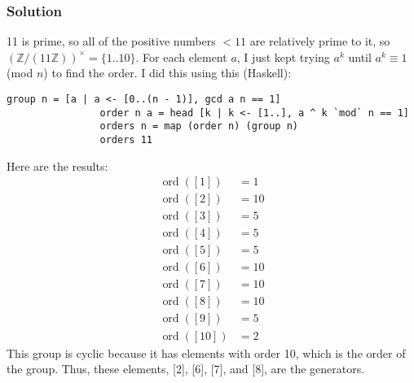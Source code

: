 \documentclass[fleqn]{article}
\DeclareMathOperator{\ord}{ord}
\begin{document}
            \subsubsection{Solution}
            11 is prime, so all of the positive numbers $< 11$ are relatively prime to it, so $(\mathbb{Z}/(11 \mathbb{Z}))^{\times} = \{1..10\}$.  For each element $a$, I just kept trying $a^k$ until $a^k \equiv 1$ (mod $n$) to find the order.  I did this using this (Haskell): 
            \begin{Verbatim}[xleftmargin=-2cm]
                group n = [a | a <- [0..(n - 1)], gcd a n == 1]
                order n a = head [k | k <- [1..], a ^ k `mod` n == 1]
                orders n = map (order n) (group n)
                orders 11
            \end{Verbatim}
            Here are the results:
            \begin{align}
                \ord([1])  &= 1 \\
                \ord([2])  &= 10 \\
                \ord([3])  &= 5 \\
                \ord([4])  &= 5 \\
                \ord([5])  &= 5 \\
                \ord([6])  &= 10 \\
                \ord([7])  &= 10 \\
                \ord([8])  &= 10 \\
                \ord([9])  &= 5 \\
                \ord([10]) &= 2
            \end{align}
            This group is cyclic because it has elements with order 10, which is the order of the group.  Thus, these elements, [2], [6], [7], and [8], are the generators.
            
        
\end{document}
